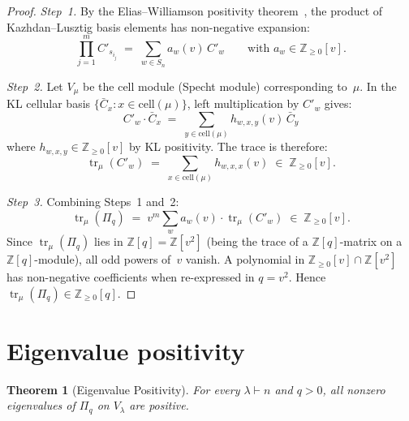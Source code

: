 \documentclass[11pt]{article}
\newtheorem{theorem}{Theorem}
\theoremstyle{remark}
\begin{document}
\begin{proof}
\emph{Step~1.}
By the Elias--Williamson positivity theorem~\cite{EW14}, the product of
Kazhdan--Lusztig basis elements has non-negative expansion:
\[
  \prod_{j=1}^m C'_{s_{i_j}}
  \;=\; \sum_{w \in S_n} a_w(v)\, C'_w
  \qquad\text{with } a_w \in \mathbb{Z}_{\geq 0}[v].
\]

\emph{Step~2.}
Let $V_\mu$ be the cell module (Specht module) corresponding to~$\mu$.
In the KL cellular basis $\{\bar{C}_x : x \in \mathrm{cell}(\mu)\}$,
left multiplication by $C'_w$ gives:
\[
  C'_w \cdot \bar{C}_x
  \;=\; \sum_{y \in \mathrm{cell}(\mu)} h_{w,x,y}(v)\, \bar{C}_y
\]
where $h_{w,x,y} \in \mathbb{Z}_{\geq 0}[v]$ by KL positivity.
The trace is therefore:
\[
  \operatorname{tr}_\mu(C'_w)
  \;=\; \sum_{x \in \mathrm{cell}(\mu)} h_{w,x,x}(v)
  \;\in\; \mathbb{Z}_{\geq 0}[v].
\]

\emph{Step~3.}
Combining Steps~1 and~2:
\[
  \operatorname{tr}_\mu(\Pi_q)
  \;=\; v^m \sum_{w} a_w(v) \cdot \operatorname{tr}_\mu(C'_w)
  \;\in\; \mathbb{Z}_{\geq 0}[v].
\]
Since $\operatorname{tr}_\mu(\Pi_q)$ lies in $\mathbb{Z}[q] = \mathbb{Z}[v^2]$
(being the trace of a $\mathbb{Z}[q]$-matrix on a $\mathbb{Z}[q]$-module),
all odd powers of~$v$ vanish.
A polynomial in $\mathbb{Z}_{\geq 0}[v] \cap \mathbb{Z}[v^2]$ has
non-negative coefficients when re-expressed in $q = v^2$.
Hence $\operatorname{tr}_\mu(\Pi_q) \in \mathbb{Z}_{\geq 0}[q]$.
\end{proof}

\section{Eigenvalue positivity}

\begin{theorem}[Eigenvalue Positivity]\label{thm:eigenvalue}
For every $\lambda \vdash n$ and $q > 0$, all nonzero eigenvalues of\/
$\Pi_q$ on $V_\lambda$ are positive.
\end{theorem}
\end{document}
